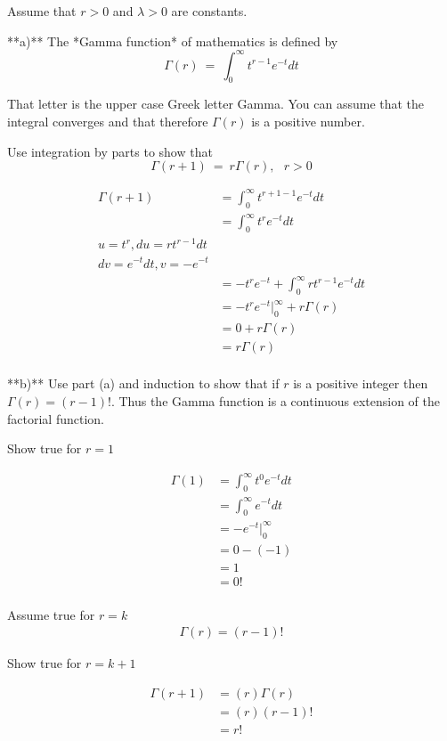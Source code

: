 \documentclass{report}
\begin{document}
Assume that $r > 0$ and $\lambda > 0$ are constants.

**a)** The *Gamma function* of mathematics is defined by
$$
\Gamma (r) ~ = ~ \int_0^\infty t^{r-1} e^{-t} dt
$$

That letter is the upper case Greek letter Gamma. You can assume that the integral converges and that therefore $\Gamma(r)$ is a positive number.

Use integration by parts to show that 
$$
\Gamma(r+1) ~ = ~ r\Gamma(r), ~~~ r > 0
$$

\begin{align*}
	\Gamma(r+1) &= \int_{0}^{\infty } t^{r+1-1}e^{-t}dt \\
	&= \int_{0}^{\infty }t^{r}e^{-t}dt \\
	u = t^{r}, du = rt^{r-1}dt \\
	dv = e^{-t}dt, v = -e^{-t}\\
	&= -t^{r}e^{-t} + \int_{0}^{\infty } rt^{r-1}e^{-t}dt \\
	&= -t^{r} e^{-t} \rvert _{0}^{\infty } + r \Gamma(r) \\
	&= 0 + r\Gamma(r) \\
	&= r\Gamma(r) \\
\end{align*}


**b)** Use part (a) and induction to show that if $r$ is a positive integer then $\Gamma(r) = (r-1)!$. Thus the Gamma function is a continuous extension of the factorial function.


Show true for $ r=1 $ 

\begin{align*}
	\Gamma(1) &= \int_{0}^{\infty } t^{0} e^{-t}dt \\
	&= \int_{0}^{\infty }e^{-t}dt \\
	&= -e^{-t} \rvert_{0}^{\infty } \\
	&= 0 - (-1) \\
	&= 1 \\
	&= 0! \\
\end{align*}


Assume true for $ r=k $ 
\begin{align*}
	\Gamma(r) = (r-1)!
\end{align*}


Show true for $ r=k+1 $ 

\begin{align*}
	\Gamma(r+1) &= (r)\Gamma(r) \\
	&= (r)(r-1)! \\
	&= r! \\
\end{align*}
\end{document}
